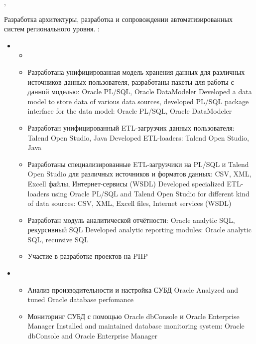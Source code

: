 \documentclass[11pt,a4paper,sans]{moderncv}        %
\begin{document}
{\protect{}}
{\cityperm, \country}
{}
{
	{Разработка архитектуры, разработка и сопровождении автоматизированных систем регионального уровня.}
	{}\newline{}
	\achievements:
	\begin{itemize}
	\item {}
		\begin{itemize}
			\item {}
			\item {}
				{Разработана унифицированная модель хранения данных для различных источников данных пользователя, разработаны пакеты для работы с данной моделью: Oracle PL/SQL, Oracle DataModeler}
				{Developed a data model to store data of various data sources, developed PL/SQL package interface for the data model: Oracle PL/SQL, Oracle DataModeler}
			\item {}
				{Разработан унифицированный ETL-загрузчик данных пользователя: Talend Open Studio, Java}
				{Developed ETL-loaders: Talend Open Studio, Java}
			\item {}
				{Разработаны специализированные ETL-загрузчики на PL/SQL и Talend Open Studio для различных источников и форматов данных: CSV, XML, Excell файлы, Интернет-сервисы (WSDL)}		
				{Developed specialized ETL-loaders using Oracle PL/SQL and Talend Open Studio for different kind of data sources: CSV, XML, Excell files, Internet services (WSDL)  }
			\item {}
				{Разработан модуль аналитической отчётности: Oracle analytic SQL, рекурсивный SQL}		
				{Developed analytic reporting modules: Oracle analytic SQL, recursive SQL}
			\item {}
				{Участие в разработке проектов на PHP}
				{}
		\end{itemize}
	\item {}
		\begin{itemize}
			\item {}
				{Анализ производительности и настройка СУБД Oracle}
				{Analyzed and tuned Oracle database perfomance}
			\item {}
				{Мониторинг СУБД с помощью Oracle dbConsole и Oracle Enterprise Manager}
				{Installed and maintained database monitoring system: Oracle dbConsole and Oracle Enterprise Manager}

\end{itemize}
\end{itemize}}
\end{document}
